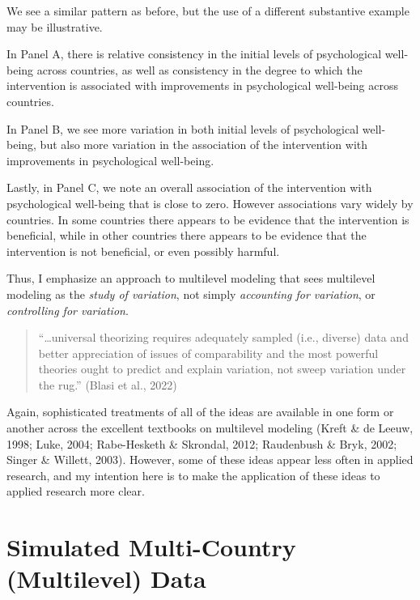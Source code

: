 \documentclass[
  letterpaper,
  DIV=11,
  numbers=noendperiod]{scrreprt}
\begin{document}
We see a similar pattern as before, but the use of a different
substantive example may be illustrative.

In Panel A, there is relative consistency in the initial levels of
psychological well-being across countries, as well as consistency in the
degree to which the intervention is associated with improvements in
psychological well-being across countries.

In Panel B, we see more variation in both initial levels of
psychological well-being, but also more variation in the association of
the intervention with improvements in psychological well-being.

Lastly, in Panel C, we note an overall association of the intervention
with psychological well-being that is close to zero. However
associations vary widely by countries. In some countries there appears
to be evidence that the intervention is beneficial, while in other
countries there appears to be evidence that the intervention is not
beneficial, or even possibly harmful.

Thus, I emphasize an approach to multilevel modeling that sees
multilevel modeling as the \emph{study of variation}, not simply
\emph{accounting for variation}, or \emph{controlling for variation}.

\begin{quote}
``\ldots universal theorizing requires adequately sampled (i.e.,
diverse) data and better appreciation of issues of comparability and the
most powerful theories ought to predict and explain variation, not sweep
variation under the rug.'' (Blasi et al., 2022)
\end{quote}

Again, sophisticated treatments of all of the ideas are available in one
form or another across the excellent textbooks on multilevel modeling
(Kreft \& de Leeuw, 1998; Luke, 2004; Rabe-Hesketh \& Skrondal, 2012;
Raudenbush \& Bryk, 2002; Singer \& Willett, 2003). However, some of
these ideas appear less often in applied research, and my intention here
is to make the application of these ideas to applied research more
clear.


\hypertarget{simulated-multi-country-multilevel-data}{%
\chapter{Simulated Multi-Country (Multilevel)
Data}\label{simulated-multi-country-multilevel-data}}
\end{document}
